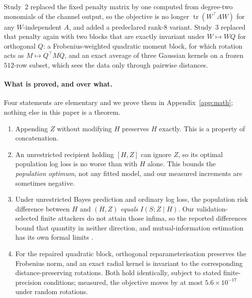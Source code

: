 \documentclass[10pt]{article}
\begin{document}
Study~2 replaced the fixed penalty matrix by one computed from degree-two monomials of the channel
output, so the objective is no longer $\operatorname{tr}(W^\top AW)$ for any $W$-independent $A$, and
added a predeclared rank-8 variant. Study~3 replaced that penalty again with two blocks that are
exactly invariant under $W\mapsto WQ$ for orthogonal $Q$: a Frobenius-weighted quadratic moment block,
for which rotation acts as $M\mapsto Q^\top MQ$, and an exact average of three Gaussian kernels on a
frozen $512$-row subset, which sees the data only through pairwise distances.

\paragraph{What is proved, and over what.} Four statements are elementary and we prove them in
Appendix~\ref{app:math}; nothing else in this paper is a theorem.

\begin{enumerate}\itemsep1pt
\item Appending $Z$ without modifying $H$ preserves $H$ exactly. This is a property of concatenation.
\item An unrestricted recipient holding $[H,Z]$ can ignore $Z$, so its optimal population log loss is
no worse than with $H$ alone. This bounds the \emph{population optimum}, not any fitted model, and
our measured increments are sometimes negative.
\item Under unrestricted Bayes prediction and ordinary log loss, the population risk difference
between $H$ and $(H,Z)$ \emph{equals} $I(S;Z\mid H)$. Our validation-selected finite attackers do not
attain those infima, so the reported differences bound that quantity in neither direction, and
mutual-information estimation has its own formal limits \citep{mcallester2020formal}.
\item For the repaired quadratic block, orthogonal reparameterisation preserves the Frobenius norm,
and an exact radial kernel is invariant to the corresponding distance-preserving rotations. Both hold
identically, subject to stated finite-precision conditions; measured, the objective moves by at most
$5.6\times10^{-17}$ under random rotations.
\end{enumerate}
\end{document}
